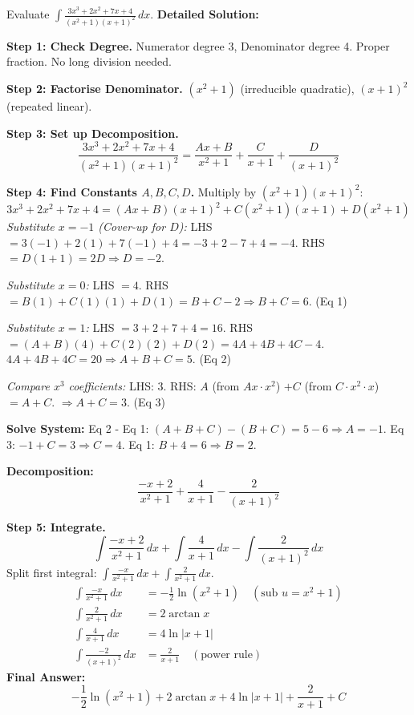 \documentclass[11pt]{article}
\begin{document}
\begin{exoresolu}
Evaluate $\displaystyle \int \frac{3x^3 + 2x^2 + 7x + 4}{(x^2+1)(x+1)^2}\,dx$.
\tcblower
\textbf{Detailed Solution:}

\textbf{Step 1: Check Degree.} Numerator degree 3, Denominator degree 4. Proper fraction. No long division needed.

\textbf{Step 2: Factorise Denominator.} $(x^2+1)$ (irreducible quadratic), $(x+1)^2$ (repeated linear).

\textbf{Step 3: Set up Decomposition.}
\[
\frac{3x^3 + 2x^2 + 7x + 4}{(x^2+1)(x+1)^2} = \frac{Ax+B}{x^2+1} + \frac{C}{x+1} + \frac{D}{(x+1)^2}
\]

\textbf{Step 4: Find Constants $A, B, C, D$.}
Multiply by $(x^2+1)(x+1)^2$:
\[
3x^3 + 2x^2 + 7x + 4 = (Ax+B)(x+1)^2 + C(x^2+1)(x+1) + D(x^2+1)
\]
\emph{Substitute $x=-1$ (Cover-up for $D$):}
LHS $= 3(-1)+2(1)+7(-1)+4 = -3+2-7+4 = -4$.
RHS $= D(1+1) = 2D \Rightarrow D = -2$.

\emph{Substitute $x=0$:}
LHS $= 4$. RHS $= B(1) + C(1)(1) + D(1) = B + C - 2 \Rightarrow B + C = 6$. \quad (Eq 1)

\emph{Substitute $x=1$:}
LHS $= 3+2+7+4=16$. RHS $= (A+B)(4) + C(2)(2) + D(2) = 4A+4B+4C-4$.
$4A+4B+4C = 20 \Rightarrow A+B+C = 5$. \quad (Eq 2)

\emph{Compare $x^3$ coefficients:}
LHS: $3$. RHS: $A$ (from $Ax\cdot x^2$) $+ C$ (from $C\cdot x^2\cdot x$) $= A+C$.
$\Rightarrow A + C = 3$. \quad (Eq 3)

\textbf{Solve System:}
Eq 2 - Eq 1: $(A+B+C) - (B+C) = 5 - 6 \Rightarrow A = -1$.
Eq 3: $-1 + C = 3 \Rightarrow C = 4$.
Eq 1: $B + 4 = 6 \Rightarrow B = 2$.

\textbf{Decomposition:}
\[
\frac{-x+2}{x^2+1} + \frac{4}{x+1} - \frac{2}{(x+1)^2}
\]

\textbf{Step 5: Integrate.}
\[
\int \frac{-x+2}{x^2+1}\,dx + \int \frac{4}{x+1}\,dx - \int \frac{2}{(x+1)^2}\,dx
\]
Split first integral: $\int \frac{-x}{x^2+1}\,dx + \int \frac{2}{x^2+1}\,dx$.
\begin{align*}
\int \frac{-x}{x^2+1}\,dx &= -\frac{1}{2}\ln(x^2+1) \quad (\text{sub } u=x^2+1) \\
\int \frac{2}{x^2+1}\,dx &= 2\arctan x \\
\int \frac{4}{x+1}\,dx &= 4\ln|x+1| \\
\int \frac{-2}{(x+1)^2}\,dx &= \frac{2}{x+1} \quad (\text{power rule})
\end{align*}
\textbf{Final Answer:}
\[
\boxed{-\frac{1}{2}\ln(x^2+1) + 2\arctan x + 4\ln|x+1| + \frac{2}{x+1} + C}
\]
\end{exoresolu}
\end{document}
